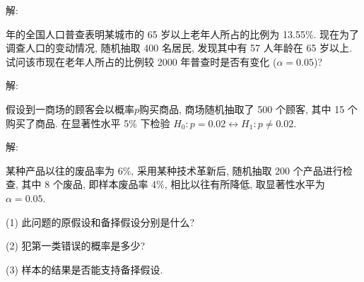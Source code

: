 \documentclass[standard]{ExBook}
\begin{document}
\begin{qitems}
\vspace{-5em}

    \begin{bbox}
解: 
    \end{bbox}

\vspace{-5em}

    \begin{bbox}
    \begin{shaded}
         年的全国人口普查表明某城市的 65 岁以上老年人所占的比例为 13.55\%. 现在为了调查人口的变动情况, 随机抽取 400 名居民, 发现其中有 57 人年龄在 65 岁以上. 试问该市现在老年人所占的比例较 2000 年普查时是否有变化 ($\alpha=0.05$)?
    \end{shaded}
    \end{bbox}

\vspace{-5em}

    \begin{bbox}
解: 
    \end{bbox}

\vspace{-5em}

    \begin{bbox}
    \begin{shaded}
        \qitem
假设到一商场的顾客会以概率$p$购买商品, 商场随机抽取了 500 个顾客, 其中 15 个购买了商品. 在显著性水平 5\% 下检验 $H_0 : p=0.02 \longleftrightarrow H_1 : p \neq 0.02$.
    \end{shaded}
    \end{bbox}

\vspace{-5em}

    \begin{bbox}
解: 
    \end{bbox}

\vspace{-5em}

    \begin{bbox}
    \begin{shaded}
        \qitem
某种产品以往的废品率为 6\%, 采用某种技术革新后, 随机抽取 200 个产品进行检查, 其中 8 个废品, 即样本废品率 4\%, 相比以往有所降低, 取显著性水平为$\alpha=0.05$.

(1) 此问题的原假设和备择假设分别是什么?

(2) 犯第一类错误的概率是多少?

(3) 样本的结果是否能支持备择假设.
    \end{shaded}
    \end{bbox}


\end{qitems}
\end{document}
